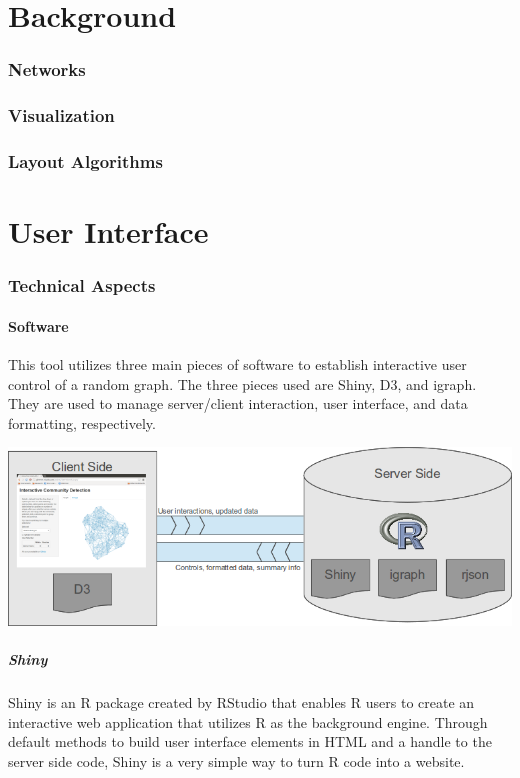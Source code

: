 \documentclass{article}\usepackage{graphicx, color}
\begin{document}
\part{Background}
\section{Networks}
\section{Visualization}
\section{Layout Algorithms}

\part{User Interface}
\section{Technical Aspects}
\subsection{Software}
This tool utilizes three main pieces of software to establish interactive user control of a random graph. The three pieces used are Shiny, D3, and igraph. They are used to manage server/client interaction, user interface, and data formatting, respectively.

\includegraphics[width=.9\textwidth]{images/clientserverflow.png}


\subsubsection{Shiny}
Shiny is an R package created by RStudio that enables R users to create an interactive web application that utilizes R as the background engine.\cite{rs-shiny} Through default methods to build user interface elements in HTML and a handle to the server side code, Shiny is a very simple way to turn R code into a website. 
\end{document}

